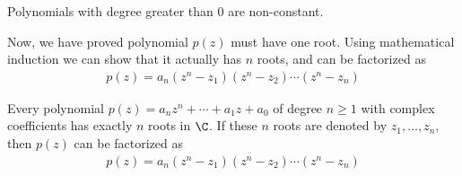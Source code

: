 \documentclass[thmcnt=section, color=cyan, 12pt]{my-elegantbook}
\begin{document}
\begin{proposition} \label{pro:4}
    Polynomials with degree greater than $0$ are non-constant.
\end{proposition}

Now, we have proved polynomial $p(z)$ must have one root. Using mathematical
induction we can show that it actually has $n$ roots, and can be factorized as
\begin{align*}
    p(z) = a_n (z^n - z_1) (z^n - z_2) \cdots (z^n - z_n)
\end{align*}

\begin{corollary}
    Every polynomial $p(z) = a_n z^n + \cdots + a_1 z + a_0$ of degree $n \geq 1$ with
    complex coefficients has exactly $n$ roots in $\C$. If these $n$ roots are
    denoted by $z_1, \ldots, z_n$, then $p(z)$ can be factorized as
    \begin{align*}
        p(z) = a_n (z^n - z_1) (z^n - z_2) \cdots (z^n - z_n)
    \end{align*}
\end{corollary}
\end{document}
